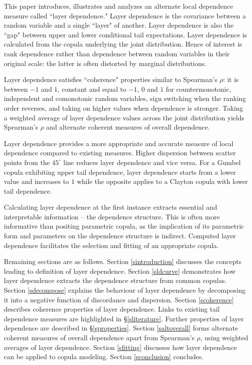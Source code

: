 \documentclass[authoryear]{elsarticle}
\newcommand{\sref}[1]{\S\ref{#1}}
\newcommand{\aref}[1]{\ref{#1}}
\begin{document}
This paper introduces, illustrates and analyzes an alternate local dependence measure called  ``layer dependence." Layer dependence is the covariance between a random variable and a single ``layer" of another. Layer dependence is also the ``gap" between upper and lower conditional tail expectations. Layer dependence is calculated  from the copula underlying the joint distribution.  Hence of interest is rank dependence rather than dependence between random variables in their original scale: the latter is often distorted by marginal distributions.


Layer dependence satisfies ``coherence" properties similar to Spearman's $\rho$: it is between $-1$ and $1$, constant and equal to $-1$, $0$ and $1$ for countermonotonic, independent and comonotonic random variables, sign switching when the ranking order reverses, and taking on higher values when dependence is stronger. Taking a weighted average of layer dependence values across the joint distribution yields Spearman's $\rho$ and alternate coherent measures of overall dependence.

Layer dependence provides a more appropriate and accurate measure of local dependence compared to existing measures. Higher dispersion between scatter points from the $45^\circ$ line reduces layer dependence and vice versa. For a Gumbel copula exhibiting upper tail dependence, layer dependence starts from a lower value and increases to $1$ while the opposite applies to a Clayton copula with lower tail dependence.

Calculating layer dependence at the first instance extracts essential and interpretable information -- the dependence structure. This is often more informative than positing parametric copula, as the implication of its parametric form and parameters on the dependence structure is indirect. Computed layer dependence facilitates the selection and fitting of an appropriate copula.


Remaining sections are as follows. Section \aref{sintroduction} discusses the concepts leading to definition of layer dependence. Section \aref{sldcurve} demonstrates how layer dependence extracts the dependence structure from common copulas. Section \aref{sdecompose} explains the behaviour of layer dependence by decomposing it into a negative function of discordance and dispersion. Section \aref{scoherence} describes coherence properties of layer dependence. Links to existing tail dependence measures are highlighted in  \sref{sliterature}. Further properties of layer dependence are described in  \sref{sproperties}. Section \aref{saltoverall} forms alternate coherent measures of overall dependence apart from Spearman's $\rho$, using weighted averages of layer dependence. Section \aref{sfitting} discusses how layer dependence can be applied to copula modeling. Section \aref{sconclusion} concludes.
\end{document}
